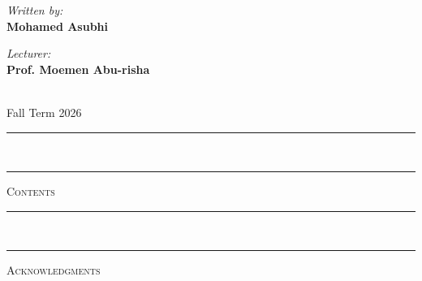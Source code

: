 \documentclass[11pt,a4paper]{article}
\newcommand{\R}{\mathbb{R}}
\begin{document}
\begin{titlepage}
		\vfill
		
		\vspace{1cm}
		\begin{minipage}{0.45\textwidth}
			\begin{flushleft}
				\textit{Written by:}\\
				\textbf{Mohamed Asubhi}
			\end{flushleft}
		\end{minipage}
		\begin{minipage}{0.45\textwidth}
			\begin{flushright}
				\textit{Lecturer:}\\
				\textbf{Prof. Moemen Abu-risha}
			\end{flushright}
		\end{minipage}\\[2.5em]
		
		{\large Fall Term 2026}
	\end{titlepage}
	
	\newpage
	
	\pagestyle{plain} 
	
	\vspace*{1em}
	\noindent\rule{\textwidth}{1.2pt} \\[-0.85\baselineskip]
	\noindent\rule{\textwidth}{0.4pt}
	\begin{center}
		\huge \textsc{Contents}
	\end{center}
	\vspace{1.5em}
	
	\tableofcontents
	
	\newpage
	\vspace*{1em}
	\noindent\rule{\textwidth}{1.2pt} \\[-0.85\baselineskip]
	\noindent\rule{\textwidth}{0.4pt}
	\begin{center}
		\huge \textsc{Acknowledgments}
	\end{center}
	\vspace{2em}
	
\end{document}
